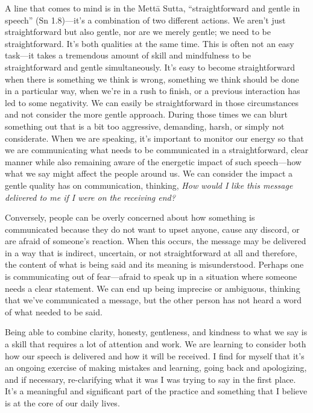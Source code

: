 A line that comes to mind is in the Mettā Sutta, ``straightforward and 
gentle in speech'' (Sn 1.8)---it's a combination of two different 
actions. We aren't just straightforward but also gentle, nor are we 
merely gentle; we need to be straightforward. It's both qualities at 
the same time. This is often not an easy task---it takes a tremendous 
amount of skill and mindfulness to be straightforward and gentle 
simultaneously. It's easy to become straightforward when there is 
something we think is wrong, something we think should be done in a 
particular way, when we're in a rush to finish, or a previous 
interaction has led to some negativity. We can easily be 
straightforward in those circumstances and not consider the more gentle 
approach. During those times we can blurt something out that is a bit 
too aggressive, demanding, harsh, or simply not considerate. When we 
are speaking, it's important to monitor our energy so that we are 
communicating what needs to be communicated in a straightforward, clear 
manner while also remaining aware of the energetic impact of such 
speech---how what we say might affect the people around us. We can 
consider the impact a gentle quality has on communication, thinking, 
\emph{How would I like this message delivered to me if I were on the 
receiving end?}

Conversely, people can be overly concerned about how something is 
communicated because they do not want to upset anyone, cause any 
discord, or are afraid of someone's reaction. When this occurs, the 
message may be delivered in a way that is indirect, uncertain, or not 
straightforward at all and therefore, the content of what is being said 
and its meaning is misunderstood. Perhaps one is communicating out of 
fear---afraid to speak up in a situation where someone needs a clear 
statement. We can end up being imprecise or ambiguous, thinking that 
we've communicated a message, but the other person has not heard a word 
of what needed to be said.

Being able to combine clarity, honesty, gentleness, and kindness to 
what we say is a skill that requires a lot of attention and work. We 
are learning to consider both how our speech is delivered and how it 
will be received. I find for myself that it's an ongoing exercise of 
making mistakes and learning, going back and apologizing, and if 
necessary, re-clarifying what it was I was trying to say in the first 
place. It's a meaningful and significant part of the practice and 
something that I believe is at the core of our daily lives.

